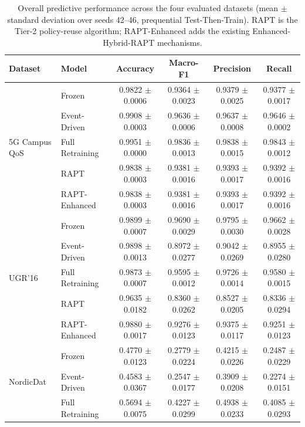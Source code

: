 \begin{table}[t]
\centering
\caption{Overall predictive performance across the four evaluated datasets
(mean $\pm$ standard deviation over seeds 42--46, prequential Test-Then-Train).
RAPT is the Tier-2 policy-reuse algorithm; RAPT-Enhanced adds the existing
Enhanced-Hybrid-RAPT mechanisms.}
\label{tab:results_main_performance}
\begin{tabular}{llcccc}
\toprule
Dataset & Model & Accuracy & Macro-F1 & Precision & Recall \\
\midrule
\multirow{5}{*}{5G Campus QoS}
 & Frozen          & 0.9822 $\pm$ 0.0006 & 0.9364 $\pm$ 0.0023 & 0.9379 $\pm$ 0.0025 & 0.9377 $\pm$ 0.0017 \\
 & Event-Driven    & 0.9908 $\pm$ 0.0003 & 0.9636 $\pm$ 0.0006 & 0.9637 $\pm$ 0.0008 & 0.9646 $\pm$ 0.0002 \\
 & Full Retraining & 0.9951 $\pm$ 0.0000 & 0.9836 $\pm$ 0.0013 & 0.9838 $\pm$ 0.0015 & 0.9843 $\pm$ 0.0012 \\
 & RAPT            & 0.9838 $\pm$ 0.0003 & 0.9381 $\pm$ 0.0016 & 0.9393 $\pm$ 0.0017 & 0.9392 $\pm$ 0.0016 \\
 & RAPT-Enhanced   & 0.9838 $\pm$ 0.0003 & 0.9381 $\pm$ 0.0016 & 0.9393 $\pm$ 0.0017 & 0.9392 $\pm$ 0.0016 \\
\midrule
\multirow{5}{*}{UGR'16}
 & Frozen          & 0.9899 $\pm$ 0.0007 & 0.9690 $\pm$ 0.0029 & 0.9795 $\pm$ 0.0030 & 0.9662 $\pm$ 0.0028 \\
 & Event-Driven    & 0.9898 $\pm$ 0.0013 & 0.8972 $\pm$ 0.0277 & 0.9042 $\pm$ 0.0269 & 0.8955 $\pm$ 0.0280 \\
 & Full Retraining & 0.9873 $\pm$ 0.0007 & 0.9595 $\pm$ 0.0012 & 0.9726 $\pm$ 0.0014 & 0.9580 $\pm$ 0.0015 \\
 & RAPT            & 0.9635 $\pm$ 0.0182 & 0.8360 $\pm$ 0.0262 & 0.8527 $\pm$ 0.0205 & 0.8336 $\pm$ 0.0294 \\
 & RAPT-Enhanced   & 0.9880 $\pm$ 0.0017 & 0.9276 $\pm$ 0.0123 & 0.9375 $\pm$ 0.0117 & 0.9251 $\pm$ 0.0123 \\
\midrule
\multirow{5}{*}{NordicDat}
 & Frozen          & 0.4770 $\pm$ 0.0123 & 0.2779 $\pm$ 0.0224 & 0.4215 $\pm$ 0.0226 & 0.2487 $\pm$ 0.0229 \\
 & Event-Driven    & 0.4583 $\pm$ 0.0367 & 0.2547 $\pm$ 0.0177 & 0.3909 $\pm$ 0.0208 & 0.2274 $\pm$ 0.0151 \\
 & Full Retraining & 0.5694 $\pm$ 0.0075 & 0.4227 $\pm$ 0.0299 & 0.4938 $\pm$ 0.0233 & 0.4085 $\pm$ 0.0293 \\

\end{tabular}
\end{table}
